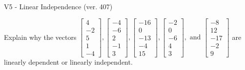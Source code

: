 \begin{exercise}
  \begin{exerciseTitle}V5 - Linear Independence (ver. 407)\end{exerciseTitle}
  \begin{exerciseStatement}
    Explain why the vectors \(\left[\begin{array}{r}
4 \\
-2 \\
5 \\
1 \\
-4
\end{array}\right] , \left[\begin{array}{r}
-4 \\
-6 \\
2 \\
-1 \\
3
\end{array}\right] , \left[\begin{array}{r}
-16 \\
0 \\
-13 \\
-4 \\
15
\end{array}\right] , \left[\begin{array}{r}
-2 \\
0 \\
-6 \\
4 \\
3
\end{array}\right] , \text{ and } \left[\begin{array}{r}
-8 \\
12 \\
-17 \\
-2 \\
9
\end{array}\right]\) are linearly dependent or linearly independent.	



\end{exerciseStatement}
\end{exercise}
